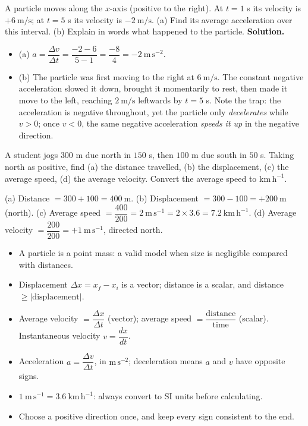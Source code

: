 \documentclass[11pt]{article}
\newcommand{\cle}[1]{{\popxbold\color{popdark}#1}}
\begin{document}
\begin{exoresolu}
A particle moves along the $x$-axis (positive to the right). At $t = 1$ s its velocity is $+6\ \mathrm{m/s}$; at $t = 5$ s its velocity is $-2\ \mathrm{m/s}$. (a) Find its average acceleration over this interval. (b) Explain in words what happened to the particle.
\tcblower
\textbf{Solution.}
\begin{itemize}
\item (a) $a = \dfrac{\Delta v}{\Delta t} = \dfrac{-2 - 6}{5 - 1} = \dfrac{-8}{4} = -2\ \mathrm{m\,s^{-2}}$.
\item (b) The particle was first moving to the right at $6\ \mathrm{m/s}$. The constant negative acceleration slowed it down, brought it momentarily to rest, then made it move to the left, reaching $2\ \mathrm{m/s}$ leftwards by $t = 5$ s. Note the trap: the acceleration is negative throughout, yet the particle only \emph{decelerates} while $v > 0$; once $v < 0$, the same negative acceleration \emph{speeds it up} in the negative direction.
\end{itemize}
\end{exoresolu}

\begin{exercice}[]
A student jogs $300$ m due north in $150$ s, then $100$ m due south in $50$ s. Taking north as positive, find (a) the distance travelled, (b) the displacement, (c) the average speed, (d) the average velocity. Convert the average speed to $\mathrm{km\,h^{-1}}$.
\end{exercice}

\begin{corrige}[Exercise 1]
(a) Distance $= 300 + 100 = 400\ \mathrm{m}$. (b) Displacement $= 300 - 100 = +200\ \mathrm{m}$ (north). (c) Average speed $= \dfrac{400}{200} = 2\ \mathrm{m\,s^{-1}} = 2 \times 3.6 = 7.2\ \mathrm{km\,h^{-1}}$. (d) Average velocity $= \dfrac{200}{200} = +1\ \mathrm{m\,s^{-1}}$, directed north.
\end{corrige}

\begin{aretenir}
\begin{itemize}
\item A \cle{particle} is a point mass: a valid model when size is negligible compared with distances.
\item \cle{Displacement} $\Delta x = x_f - x_i$ is a vector; \cle{distance} is a scalar, and distance $\geq |\text{displacement}|$.
\item Average velocity $= \dfrac{\Delta x}{\Delta t}$ (vector); average speed $= \dfrac{\text{distance}}{\text{time}}$ (scalar). Instantaneous velocity $v = \dfrac{dx}{dt}$.
\item Acceleration $a = \dfrac{\Delta v}{\Delta t}$, in $\mathrm{m\,s^{-2}}$; deceleration means $a$ and $v$ have opposite signs.
\item $1\ \mathrm{m\,s^{-1}} = 3.6\ \mathrm{km\,h^{-1}}$: always convert to SI units before calculating.
\item Choose a positive direction once, and keep every sign consistent to the end.
\end{itemize}
\end{aretenir}
\end{document}
